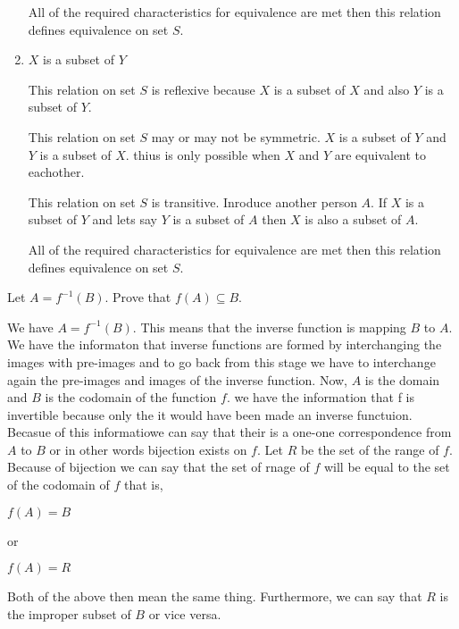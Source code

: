 \documentclass[addpoints]{exam}
\begin{document}
\begin{questions}
\begin{parts}
\begin{solution}
\begin{enumerate}
        All of the required characteristics for equivalence are met then this relation defines equivalence on set $S$.    
        
        \item $X$ is a subset of $Y$
                
        This relation on set $S$ is reflexive because $X$ is a subset of $X$ and also $Y$ is a subset of $Y$.
        
        This relation on set $S$ may or may not be symmetric. $X$ is a subset of $Y$ and $Y$ is a subset of $X$. thius is only possible when $X$ and $Y$ are equivalent to eachother. 
        
        This relation on set $S$ is transitive. Inroduce another person $A$. If $X$ is a subset of $Y$ and lets say $Y$ is a subset of $A$ then $X$ is also a subset of $A$.
        
        All of the required characteristics for equivalence are met then this relation defines equivalence on set $S$.    
        
    \end{enumerate}
    
  \end{solution}

\end{parts}

\question[15] Let $A = f^{-1}(B)$. Prove that $f(A) \subseteq B$.
  \begin{solution}
        
    We have $A = f^{-1}(B)$. This means that the inverse function is mapping $B$ to $A$. We have the informaton that inverse functions are formed by interchanging the images with pre-images and to go back from this stage we have to interchange again the pre-images and images of the inverse function. Now, $A$ is the domain and $B$ is the codomain of the function $f$. we have the information that f is invertible because only the it would have been made an inverse functuion. Becasue of this informatiowe can say that their is a one-one correspondence from $A$ to $B$ or in other words bijection exists on $f$. Let $R$ be the set of the range of $f$. Because of bijection we can say that the set of rnage of $f$ will be equal to the set of the codomain of $f$ that is,
    
    $f(A)=B$
    
    or
    
    $f(A)=R$
    
    Both of the above then mean the same thing. Furthermore, we can say that $R$ is the improper subset of $B$ or vice versa.
    

\end{solution}
\end{questions}
\end{document}
